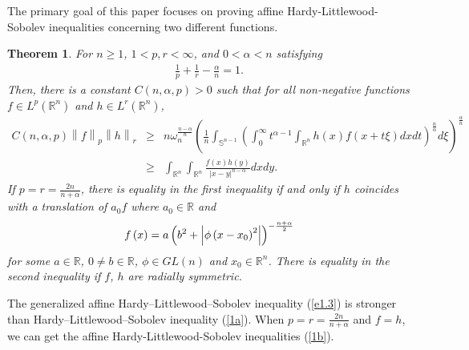 \documentclass[preprint,12pt]{elsarticle}
\newtheorem{thm}{Theorem}
\begin{document}
	The primary goal of this paper focuses on proving affine Hardy-Littlewood-Sobolev inequalities concerning two different functions. %
	\begin{thm}\label{1.1}
		For $n\ge 1$, $1<p,r<\infty $, and $0<\alpha <n$ satisfying
		\begin{eqnarray}
			\frac{1}{p}+\frac{1}{r}-\frac{\alpha }{n}=1.\nonumber   
		\end{eqnarray}
		Then, there is a constant $C\left ( n,\alpha ,p \right )>0 $ such that for all non-negative functions $f\in L^{p}\left ( \mathbb{R}^n  \right ) $ and $h\in L^{r}\left ( \mathbb{R}^n  \right ) $,
		\begin{eqnarray}\label{e1.3}
			C\left ( n,\alpha ,p \right )\left \| f \right \|_{p}\left \| h \right \|_{r}&\ge& n\omega^{\frac{n-\alpha }{n} } _{n}\left ( \frac{1}{n}\int_{\mathbb{S}^{n-1} }\left ( \int_{0}^{\infty }t^{\alpha -1}\int_{\mathbb{R}^n }h\left ( x \right )f\left ( x+t\xi  \right )dxdt      \right )^{\frac{n}{\alpha } } d\xi     \right )^{\frac{\alpha }{n}}\nonumber\\
			&\ge&\int_{\mathbb{R}^n}\int_{\mathbb{R}^n}\frac{f\left ( x \right )h\left ( y \right )  }{\left | x-y \right |^{n-\alpha }  }dxdy.
		\end{eqnarray}
		If $p=r=\frac{2n}{n+\alpha } $, there is equality in the first inequality if and only if $h$ coincides with a translation of $a_{0} f$ where $a_{0}\in \mathbb{R}$ and
		\begin{eqnarray}
			f\left ( x \right )=a\left ( b ^{2}+\left | \phi \left ( x-x_{0} \right )^{2}    \right |   \right )^{-\frac{n+\alpha }{2} }\notag
		\end{eqnarray}
		for some $a\in \mathbb{R}$, $0\ne b \in \mathbb{R}$, $\phi \in GL\left ( n \right )$ and $x_{0}\in \mathbb{R }^{n}  $. There is equality in the second inequality if $f$, $h$ are radially symmetric.
	\end{thm}
	The generalized affine Hardy–Littlewood–Sobolev inequality (\ref{e1.3}) is stronger than Hardy–Littlewood–Sobolev inequality (\ref{1a}). When $p=r=\frac{2n}{n+\alpha } $ and $f=h$, we can get the affine Hardy-Littlewood-Sobolev inequalities (\ref{1b}).  
	
\end{document}
